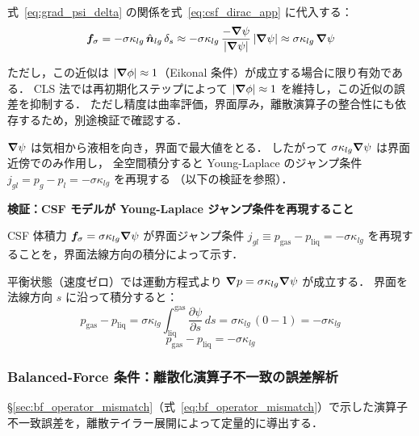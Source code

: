 式~\eqref{eq:grad_psi_delta} の関係を式~\eqref{eq:csf_dirac_app} に代入する：
\begin{equation}
  \bm{f}_\sigma = -\sigma\kappa_{lg}\,\hat{\bm{n}}_{lg}\,\delta_s
  \approx -\sigma\kappa_{lg}\,\frac{-\bm{\nabla}\psi}{|\bm{\nabla}\psi|}\,|\bm{\nabla}\psi|
  \approx \sigma\kappa_{lg}\,\bm{\nabla}\psi
  \label{eq:csf_final}
\end{equation}

ただし，この近似は $|\bm{\nabla}\phi| \approx 1$（Eikonal 条件）が成立する場合に限り有効である．
CLS 法では再初期化ステップによって $|\bm{\nabla}\phi|\approx 1$ を維持し，この近似の誤差を抑制する．
ただし精度は曲率評価，界面厚み，離散演算子の整合性にも依存するため，別途検証で確認する．

$\bm{\nabla}\psi$ は気相から液相を向き，界面で最大値をとる．
したがって $\sigma\kappa_{lg}\bm{\nabla}\psi$ は界面近傍でのみ作用し，
全空間積分すると Young-Laplace のジャンプ条件 $j_{gl}=p_g-p_l=-\sigma\kappa_{lg}$ を再現する
（以下の検証を参照）．

\medskip
\noindent\textbf{検証：CSF モデルが Young-Laplace ジャンプ条件を再現すること}
\label{sec:csf_young_laplace_app}

CSF 体積力 $\bm{f}_\sigma = \sigma\kappa_{lg}\bm{\nabla}\psi$ が界面ジャンプ条件
$j_{gl}\equiv p_{\text{gas}} - p_{\text{liq}} = -\sigma\kappa_{lg}$
を再現することを，界面法線方向の積分によって示す．

平衡状態（速度ゼロ）では運動方程式より
$\bm{\nabla} p = \sigma\kappa_{lg}\bm{\nabla}\psi$ が成立する．
界面を法線方向 $s$ に沿って積分すると：
\[
  p_{\text{gas}} - p_{\text{liq}}
  = \sigma\kappa_{lg} \int_{\text{liq}}^{\text{gas}} \frac{\partial\psi}{\partial s}\,ds
  = \sigma\kappa_{lg}\,(0 - 1) = -\sigma\kappa_{lg}
\]
\begin{equation}
  p_{\text{gas}} - p_{\text{liq}} = -\sigma\kappa_{lg}
  \label{eq:young-laplace-app}
\end{equation}

\subsubsection{Balanced-Force 条件：離散化演算子不一致の誤差解析}
\label{app:balanced_force_taylor}

§\ref{sec:bf_operator_mismatch}（式~\eqref{eq:bf_operator_mismatch}）で示した演算子不一致誤差を，離散テイラー展開によって定量的に導出する．

